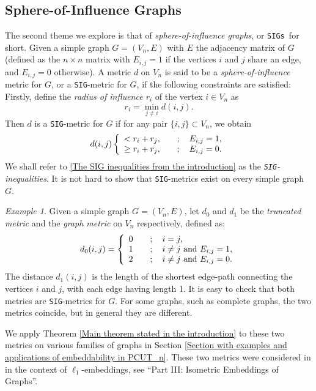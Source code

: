 \documentclass[12pt]{amsart}
\numberwithin{theorem}{section}
\theoremstyle{remark}
\newtheorem{example}[theorem]{Example}
\newcommand{\sig}{{\tt SIG }}
\newcommand{\sigg}{{\tt SIG}}
\newcommand{\sigs}{{\tt SIGs }}
\begin{document}
\subsection{Sphere-of-Influence Graphs}  \label{Section in introduction on SIGs}
The second theme we explore is that of {\em sphere-of-influence graphs}, or \sigs for short. Given a simple graph $G=(V_n,E)$ with $E$ the adjacency matrix of $G$ (defined as the $n\times n$ matrix with $E_{i,j}=1$ if the vertices $i$ and $j$ share an edge, and $E_{i,j}=0$ otherwise). A metric $d$ on $V_n$ is said to be a {\em sphere-of-influence} metric for $G$, or a \sigg-metric for $G$,  if the following constraints are satisfied: Firstly, define the {\em radius of influence $r_i$} of the vertex $i\in V_n$ as 
$$r_i = \min_{j\ne i} d(i,j).$$
Then $d$ is a \sigg-metric for $G$ if for any pair $\{i,j\}\subset V_n$, we obtain 
\begin{equation} \label{The SIG inequalities from the introduction}
d(i,j) \left\{ 
\begin{array}{ll}
< r_i+r_j, & \quad ; \quad   E_{i,j} = 1,\cr
\ge r_i+r_j, & \quad ; \quad  E_{i,j} = 0.
\end{array}
\right.  
\end{equation} 
We shall refer to \eqref{The SIG inequalities from the introduction} as the {\em \sigg-inequalities}. %
It is not hard to show that \sigg-metrics exist on every simple graph $G$.
\begin{example} \label{Example of SIG metrics from the introduction}
Given a simple graph $G= (V_n,E)$, let $d_0$ and $d_1$ be the {\em truncated metric} and the {\em graph metric} on $V_n$ respectively, defined as:
$$
d_0(i,j) = \left\{
\begin{array}{cl}
	0 & \quad ; \quad i=j, \cr 
	1 & \quad ; \quad i\ne j \text{ and } E_{i,j} = 1, \cr
	2 & \quad ; \quad i\ne j \text{ and } E_{i,j} = 0.
\end{array}
\right.
$$	
The distance $d_1(i,j)$ is the length of the shortest edge-path connecting the vertices $i$ and $j$, with each edge having length 1. It is easy to check that both metrics are \sigg-metrics for $G$. For some graphs, such as complete graphs, the two metrics coincide, but in general they are different. 

We apply Theorem \ref{Main theorem stated in the introduction} to these two metrics on various families of graphs in Section \ref{Section with examples and applications of embeddability in PCUT_n}. These two metrics were considered in \cite{DezaLaurentBook} in the context of $\ell_1$-embeddings, see ``Part III: Isometric Embeddings of Graphs''. 
\end{example} 
\end{document}
